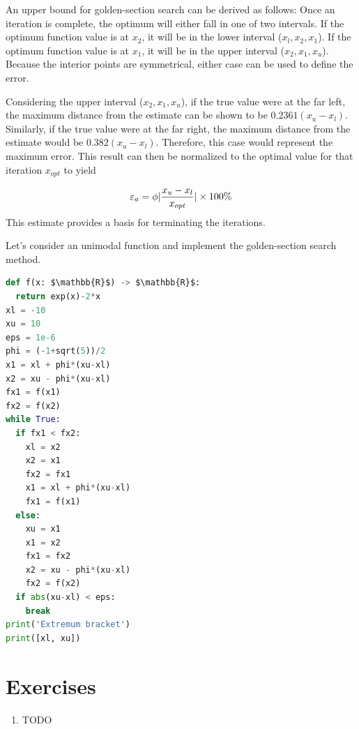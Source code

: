 \documentclass[book.tex]{subfiles}
\begin{document}
An upper bound for golden-section search can be derived as follows: Once an iteration is complete, the optimum will either fall in one of two intervals. If the optimum function value is at $x_2$, it will be in the lower interval ($x_l, x_2, x_1$). If the optimum function value is at $x_1$, it will be in the upper interval ($x_2, x_1, x_u$). Because the interior points are symmetrical, either case can be used to define the error.

Considering the upper interval ($x_2, x_1, x_u$), if the true value were at the far left, the maximum distance from the estimate can be shown to be $0.2361(x_u - x_l)$. Similarly, if the true value were at the far right, the maximum distance from the estimate would be $0.382 (x_u - x_l)$. Therefore, this case would represent the maximum error. This result can then be normalized to the optimal value for that iteration $x_{opt}$ to yield

\begin{align}
\varepsilon_a = \phi\arrowvert\dfrac{x_u - x_l}{x_{opt}}\arrowvert \times 100\%
\end{align}
This estimate provides a basis for terminating the iterations.

\begin{example}
Let's consider an unimodal function and implement the golden-section search method.

\begin{lstlisting}[language=python]
def f(x: $\mathbb{R}$) -> $\mathbb{R}$:
  return exp(x)-2*x                                        
xl = -10                                                   
xu = 10 
eps = 1e-6                                                 
phi = (-1+sqrt(5))/2
x1 = xl + phi*(xu-xl)                                      
x2 = xu - phi*(xu-xl)                                      
fx1 = f(x1)                                                
fx2 = f(x2)
while True:
  if fx1 < fx2:
    xl = x2                                                
    x2 = x1                                                
    fx2 = fx1                                              
    x1 = xl + phi*(xu-xl)                                  
    fx1 = f(x1)                                            
  else:
    xu = x1
    x1 = x2 
    fx1 = fx2
    x2 = xu - phi*(xu-xl)                                  
    fx2 = f(x2)                                            
  if abs(xu-xl) < eps:                                     
    break 
print('Extremum bracket')                                  
print([xl, xu])                                            
\end{lstlisting}
\end{example}

\section{Exercises}
\begin{enumerate}
    \item TODO
\end{enumerate}
\end{document}
